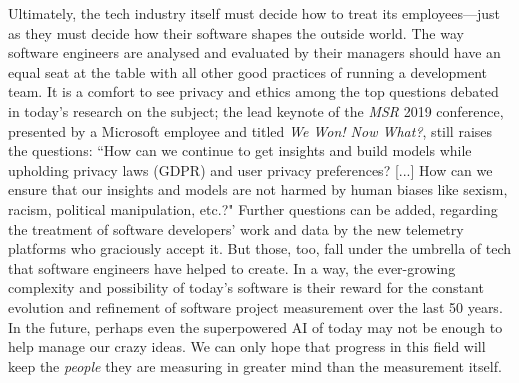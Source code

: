 \documentclass[12pt]{article}
\begin{document}
	Ultimately, the tech industry itself must decide how to treat its employees---just as they must decide how their software shapes the outside world. The way software engineers are analysed and evaluated by their managers should have an equal seat at the table with all other good practices of running a development team. It is a comfort to see privacy and ethics among the top questions debated in today's research on the subject; the lead keynote of the \textit{MSR} 2019 conference, presented by a Microsoft employee and titled \textit{We Won! Now What?}, still raises the questions: ``How can we continue to get insights and build models while upholding privacy laws (GDPR) and user privacy preferences? [...] How can we ensure that our insights and models are not harmed by human biases like sexism, racism, political manipulation, etc.?" \cite{wewon} Further questions can be added, regarding the treatment of software developers' work and data by the new telemetry platforms who graciously accept it. But those, too, fall under the umbrella of tech that software engineers have helped to create. In a way, the ever-growing complexity and possibility of today's software is their reward for the constant evolution and refinement of software project measurement over the last 50 years. In the future, perhaps even the superpowered AI of today may not be enough to help manage our crazy ideas. We can only hope that progress in this field will keep the \textit{people} they are measuring in greater mind than the measurement itself.
	
	\begin{center}
		\hrulefill
	\end{center}
	
\end{document}
